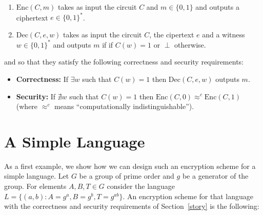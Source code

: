 \begin{enumerate}
\item $\mathrm{Enc}(C,m)$ takes as input the circuit $C$ and $m \in \{0,1\}$ and outputs a ciphertext $e \in \{0,1\}^{*}$.

\item $\mathrm{Dec}(C,e,w)$ takes as input the circuit $C$, the cipertext $e$ and a witness $w \in \{0,1\}^{*}$ and outputs $m$ if if $C(w) = 1$ or $\perp$ otherwise.
\end{enumerate}

and so that they satisfy the following correctness and security requirements:

\begin{itemize}

\item \textbf{Correctness:} If $\exists w$ such that $C(w) = 1$ then $\mathrm{Dec}(C,e,w)$ outputs $m$.

\item \textbf{Security:} If $\nexists w$ such that $C(w) = 1$ then $\mathrm{Enc}(C,0)   \approx^{c} \mathrm{Enc}(C,1) \!\ $ (where $ \approx^{c}$ means  ``computationally indistinguishable'').

\end{itemize}


\section{A Simple Language }

As a first example, we show how we can design such an encryption scheme for a simple language. Let $G$ be a group of prime order and  $g$ be a generator of the group. For elements $A, B, T \in G$ consider the language $L = \{(a,b): A = g^a, B = g^b, T = g^{ab} \}$. An encryption scheme for that language with the correctness and security requirements of Section~\ref{story} is the following:

\smallskip

